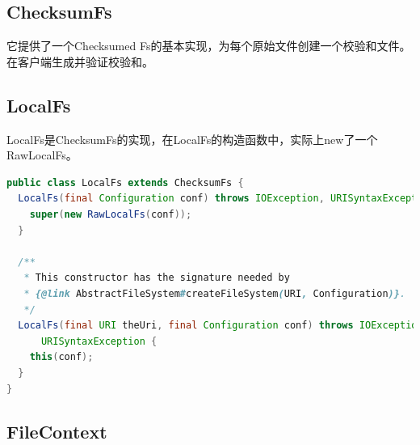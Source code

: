 \subsection{ChecksumFs}
它提供了一个Checksumed Fs的基本实现，为每个原始文件创建一个校验和文件。在客户端生成并验证校验和。


\subsection{LocalFs}
LocalFs是ChecksumFs的实现，在LocalFs的构造函数中，实际上new了一个RawLocalFs。

\begin{lstlisting}[language=Java]
public class LocalFs extends ChecksumFs {
  LocalFs(final Configuration conf) throws IOException, URISyntaxException {
    super(new RawLocalFs(conf));
  }

  /**
   * This constructor has the signature needed by
   * {@link AbstractFileSystem#createFileSystem(URI, Configuration)}.
   */
  LocalFs(final URI theUri, final Configuration conf) throws IOException,
      URISyntaxException {
    this(conf);
  }
}
\end{lstlisting}



\subsection{FileContext}
